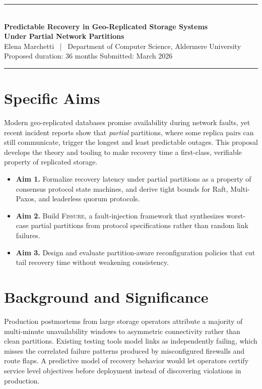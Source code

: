 \documentclass[10pt]{article}
\begin{document}
\begin{center}
  {\color{accent}\rule{\textwidth}{1.5pt}}\\[0.9em]
  {\LARGE\bfseries Predictable Recovery in Geo-Replicated Storage Systems\\[0.25em]
   \large Under Partial Network Partitions}\\[0.9em]
  {\normalsize Elena Marchetti \, | \, Department of Computer Science, Aldermere University}\\[0.2em]
  {\small Proposed duration: 36 months \quad Submitted: March 2026}\\[0.7em]
  {\color{accent}\rule{\textwidth}{0.6pt}}
\end{center}

\section{Specific Aims}
Modern geo-replicated databases promise availability during network faults, yet
recent incident reports show that \emph{partial} partitions, where some replica
pairs can still communicate, trigger the longest and least predictable outages.
This proposal develops the theory and tooling to make recovery time a
first-class, verifiable property of replicated storage.

\begin{itemize}[leftmargin=1.4em, itemsep=0.1em]
  \item \textbf{Aim 1.} Formalize recovery latency under partial partitions as a
        property of consensus protocol state machines, and derive tight bounds
        for Raft, Multi-Paxos, and leaderless quorum protocols.
  \item \textbf{Aim 2.} Build \textsc{Fissure}, a fault-injection framework that
        synthesizes worst-case partial partitions from protocol specifications
        rather than random link failures.
  \item \textbf{Aim 3.} Design and evaluate partition-aware reconfiguration
        policies that cut tail recovery time without weakening consistency.
\end{itemize}

\section{Background and Significance}
Production postmortems from large storage operators attribute a majority of
multi-minute unavailability windows to asymmetric connectivity rather than
clean partitions. Existing testing tools model links as independently failing,
which misses the correlated failure patterns produced by misconfigured
firewalls and route flaps. A predictive model of recovery behavior would let
operators certify service level objectives before deployment instead of
discovering violations in production.
\end{document}
